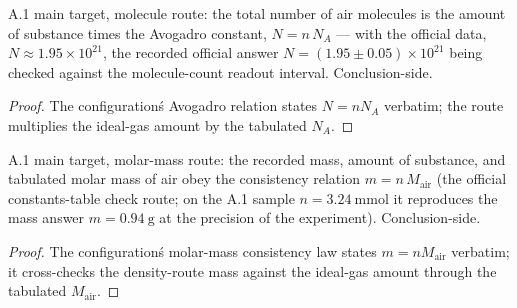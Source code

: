 \begin{theorem}
\label{thm:IPhO2026Problems_problem_IPhO_2026_4_A_1:number_of_molecules_of_confined_air}
A.1 main target, molecule route: the total number of air molecules
is the amount of substance times the Avogadro constant,
$N = n\, N_A$ --- with the official data,
$N \approx 1.95 \times 10^{21}$, the recorded official answer
$N = (1.95 \pm 0.05) \times 10^{21}$ being checked against the
molecule-count readout interval.  Conclusion-side.
\end{theorem}
\begin{proof}
The configuration\'s Avogadro relation states $N = n N_A$ verbatim;
the route multiplies the ideal-gas amount by the tabulated $N_A$.
\end{proof}

\begin{theorem}
\label{thm:IPhO2026Problems_problem_IPhO_2026_4_A_1:molar_mass_consistency}
A.1 main target, molar-mass route: the recorded mass, amount of
substance, and tabulated molar mass of air obey the consistency
relation $m = n\, M_{\mathrm{air}}$ (the official constants-table
check route; on the A.1 sample $n = 3.24\ \mathrm{mmol}$ it
reproduces the mass answer $m = 0.94\ \mathrm{g}$ at the precision
of the experiment).  Conclusion-side.
\end{theorem}
\begin{proof}
The configuration\'s molar-mass consistency law states
$m = n M_{\mathrm{air}}$ verbatim; it cross-checks the density-route
mass against the ideal-gas amount through the tabulated
$M_{\mathrm{air}}$.
\end{proof}

